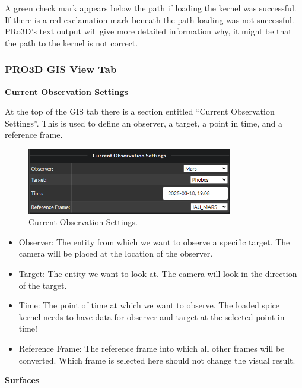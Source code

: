 A green check mark appears below the path if loading the kernel was
successful. If there is a red exclamation mark beneath the path loading
was not successful. PRo3D's text output will give more detailed
information why, it might be that the path to the kernel is not correct.

\hypertarget{pro3d-gis-view-tab}{%
	\subsubsection{PRO3D GIS View Tab}\label{pro3d-gis-view-tab}}

\hypertarget{current-observation-settings}{%
	\textbf{Current Observation
		Settings}\label{current-observation-settings}}

At the top of the GIS tab there is a section entitled ``Current
Observation Settings''. This is used to define an observer, a target, a
point in time, and a reference frame.

\begin{figure}[h!]
	\centering
	\includegraphics[width=0.8\textwidth]{pics/currentObservationSettings.png}
	\caption{Current Observation Settings.}
\end{figure}

\begin{itemize}
	\tightlist
	\item
	Observer: The entity from which we want to observe a specific target.
	The camera will be placed at the location of the observer.
	\item
	Target: The entity we want to look at. The camera will look in the
	direction of the target.
	\item
	Time: The point of time at which we want to observe. The loaded spice
	kernel needs to have data for observer and target at the selected
	point in time!
	\item
	Reference Frame: The reference frame into which all other frames will
	be converted. Which frame is selected here should not change the
	visual result.
\end{itemize}

\hypertarget{surfaces}{%
	\textbf{Surfaces}\label{surfaces}}

